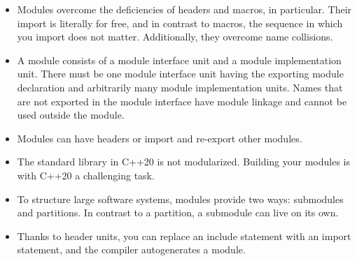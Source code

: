 \begin{tcolorbox}[colback=mygreen!5!white,colframe=mygreen!75!black,title=Building the Executable with the Microsoft Compiler]

\begin{itemize}
\item 
Modules overcome the deficiencies of headers and macros, in particular. Their import is literally for free, and in contrast to macros, the sequence in which you import does not matter. Additionally, they overcome name collisions.

\item 
A module consists of a module interface unit and a module implementation unit. There must be one module interface unit having the exporting module declaration and arbitrarily many module implementation units. Names that are not exported in the module interface have module linkage and cannot be used outside the module.

\item 
Modules can have headers or import and re-export other modules.

\item 
The standard library in C++20 is not modularized. Building your modules is with C++20 a challenging task.

\item 
To structure large software systems, modules provide two ways: submodules and partitions. In contrast to a partition, a submodule can live on its own.

\item 
Thanks to header units, you can replace an include statement with an import statement, and the compiler autogenerates a module.
\end{itemize}

\end{tcolorbox}











































